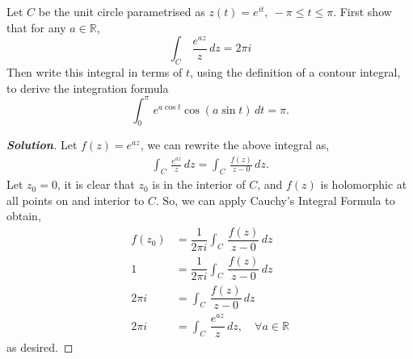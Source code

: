 \documentclass[11pt]{article}
\newenvironment{problem}[2][Problem\!]{\begin{trivlist}
\item[\hskip \labelsep {\bfseries #1}\hskip \labelsep {\bfseries #2}]}{\end{trivlist}}
\newenvironment{solution}{\begin{proof}[\textbf{\textit{Solution}}] }{\end{proof}}
\newcommand{\rr}{\mathbb R}   %
\renewcommand{\leq}{\leqslant}
\begin{document}
\begin{problem}{8.3}
Let $C$ be the unit circle parametrised as $z(t) = e^{it},\  -\pi \leq t \leq \pi$. First show that for any $a \in \rr$,
\[\int_C\, \frac{e^{az}}{z}\,dz = 2\pi i\]
Then write this integral in terms of $t$, using the definition of a contour integral, to derive the integration formula
\[\int_0^\pi\, e^{a\cos t}\cos(a\sin t)\,dt = \pi.\]
\end{problem}
\begin{solution}
    Let $f(z) = e^{a z}$, we can rewrite the above integral as,
    \begin{align*}
        \int_C\, \frac{e^{az}}{z}\,d z = \int_C\, \frac{f(z)}{z - 0}\,d z.
    \end{align*}
    Let $z_0 = 0$, it is clear that $z_0$ is in the interior of $C$, and $f(z)$ is holomorphic at all points on and interior to  $C$. So, we can apply Cauchy's Integral Formula to obtain,
    \begin{align*}
        f(z_0) &= \dfrac{1}{2\pi i }\int_C\, \dfrac{f(z)}{z - 0} \, d z  \\
        1 &= \dfrac{1}{2\pi i}\int_C\, \dfrac{f(z)}{z - 0} \, d z  \\
        2\pi i &= \int_C\, \dfrac{f(z)}{z - 0} \, d z \\
        2\pi i &= \int_C\, \dfrac{e^{a z}}{z} \, d z,\quad \forall a \in \rr
    \end{align*}
    as desired. 


\end{solution}
\end{document}
